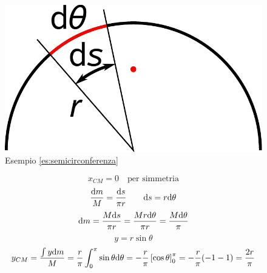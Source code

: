 \begin{Es}[semicirconferenza]
\label{es:semicirconferenza}
\begin{figure}[htp]
 \centering
 \includegraphics[scale=0.4]{immagini/fisica1/semicerchio}
 \caption{Esempio \ref{es:semicirconferenza}}
\end{figure}

\begin{equation*}x_{CM}=0 \quad\text{per simmetria}\end{equation*}
\begin{equation*}\frac{\mathrm{d} m}{M}=\frac{\mathrm{d} s}{\pi r}\qquad \mathrm{d} s=r\mathrm{d}\theta\end{equation*}
\begin{equation*}\mathrm{d} m=\frac{M\mathrm{d} s}{\pi r}=\frac{Mr\mathrm{d}\theta}{\pi r}=\frac{M\mathrm{d}\theta}{\pi}\end{equation*}
\begin{equation*}y=r \sin \theta\end{equation*}
\begin{equation*}y_{CM}=\frac{\int y\mathrm{d} m}{M}=\frac{r}{\pi}\int_0^\pi \sin\theta \mathrm{d} \theta=-\frac{r}{\pi}\left[\cos\theta\right]_0^\pi=-\frac{r}{\pi}(-1-1)=\frac{2r}{\pi}\end{equation*}
\end{Es}

